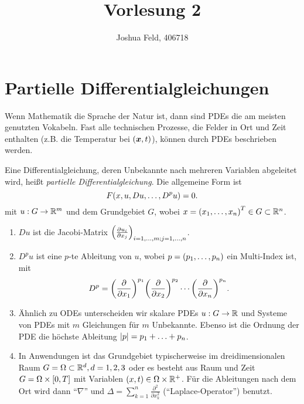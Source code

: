 \documentclass{lecture}
\institute{Applied and Computational Mathematics}
\title{Vorlesung 2}
\author{Joshua Feld, 406718}
\begin{document}
    \maketitle


    \section*{Partielle Differentialgleichungen}

    Wenn Mathematik die Sprache der Natur ist, dann sind PDEs die am meisten genutzten Vokabeln.
    Fast alle technischen Prozesse, die Felder in Ort und Zeit enthalten (z.B. die Temperatur bei \(\parentheses*{\bm{x}, t}\)), können durch PDEs beschrieben werden.

    \begin{definition}
        Eine Differentialgleichung, deren Unbekannte nach mehreren Variablen abgeleitet wird, heißt \emph{partielle Differentialgleichung}.
        Die allgemeine Form ist
        \[
            F\parentheses*{x, u, Du, \ldots, D^p u} = 0.
        \]
        mit \(u: G \to \R^m\) und dem Grundgebiet \(G\), wobei \(x = \parentheses*{x_1, \ldots, x_n}^T \in G \subset \R^n\).
    \end{definition}

    \begin{remark}
        \begin{enumerate}
            \item \(Du\) ist die Jacobi-Matrix \(\parentheses*{\frac{\partial u_i}{\partial x_j}}_{i = 1, \ldots, m; j = 1, \ldots, n}\).
            \item \(D^p u\) ist eine \(p\)-te Ableitung von \(u\), wobei \(p = \parentheses*{p_1, \ldots, p_n}\) ein Multi-Index ist, mit
            \[
                D^p = \parentheses*{\frac{\partial}{\partial x_1}}^{p_1}\parentheses*{\frac{\partial}{\partial x_2}}^{p_2}\cdots\parentheses*{\frac{\partial}{\partial x_n}}^{p_n}.
            \]
            \item Ähnlich zu ODEs unterscheiden wir skalare PDEs \(u: G \to \R\) und Systeme von PDEs mit \(m\) Gleichungen für \(m\) Unbekannte.
            Ebenso ist die Ordnung der PDE die höchste Ableitung \(\absolute*{p} = p_1 + \ldots + p_n\).
            \item In Anwendungen ist das Grundgebiet typischerweise im dreidimensionalen Raum \(G = \Omega \subset \R^d, d = 1, 2, 3\) oder es besteht aus Raum und Zeit \(G = \Omega \times \brackets*{0, T}\) mit Variablen \(\parentheses*{x, t} \in \Omega \times \R^+\).
            Für die Ableitungen nach dem Ort wird dann ``\(\nabla\)'' und \(\Delta = \sum_{k = 1}^n \frac{\partial^2}{\partial x_k^2}\) (``Laplace-Operator'') benutzt.
        \end{enumerate}
    \end{remark}
\end{document}
